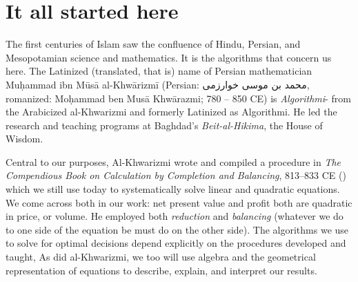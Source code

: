 \documentclass[
]{book}
\begin{document}
\hypertarget{it-all-started-here}{%
\section{It all started here}\label{it-all-started-here}}

The first centuries of Islam saw the confluence of Hindu, Persian, and Mesopotamian science and mathematics. It is the algorithms that concern us here. The Latinized (translated, that is) name of Persian mathematician Muḥammad ibn Mūsā al-Khwārizmī (Persian: محمد بن موسی خوارزمی, romanized: Moḥammad ben Musā Khwārazmi; 780 -- 850 CE) is \emph{Algorithmi}- from the Arabicized al-Khwarizmi and formerly Latinized as Algorithmi. He led the research and teaching programs at Baghdad's \emph{Beit-al-Hikima}, the House of Wisdom.

Central to our purposes, Al-Khwarizmi wrote and compiled a procedure in \emph{The Compendious Book on Calculation by Completion and Balancing}, 813--833 CE (\citet{AlKarizmi830}) which we still use today to systematically solve linear and quadratic equations. We come across both in our work: net present value and profit both are quadratic in price, or volume. He employed both \emph{reduction} and \emph{balancing} (whatever we do to one side of the equation be must do on the other side). The algorithms we use to solve for optimal decisions depend explicitly on the procedures developed and taught, As did al-Khwarizmi, we too will use algebra and the geometrical representation of equations to describe, explain, and interpret our results.
\end{document}
